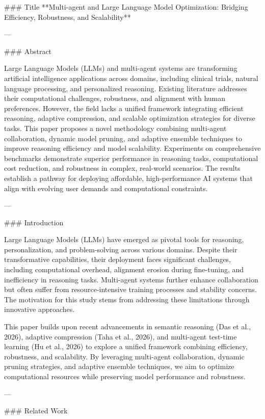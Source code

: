 ### Title
**Multi-agent and Large Language Model Optimization: Bridging Efficiency, Robustness, and Scalability**

---

### Abstract

Large Language Models (LLMs) and multi-agent systems are transforming artificial intelligence applications across domains, including clinical trials, natural language processing, and personalized reasoning. Existing literature addresses their computational challenges, robustness, and alignment with human preferences. However, the field lacks a unified framework integrating efficient reasoning, adaptive compression, and scalable optimization strategies for diverse tasks. This paper proposes a novel methodology combining multi-agent collaboration, dynamic model pruning, and adaptive ensemble techniques to improve reasoning efficiency and model scalability. Experiments on comprehensive benchmarks demonstrate superior performance in reasoning tasks, computational cost reduction, and robustness in complex, real-world scenarios. The results establish a pathway for deploying affordable, high-performance AI systems that align with evolving user demands and computational constraints.

---

### Introduction

Large Language Models (LLMs) have emerged as pivotal tools for reasoning, personalization, and problem-solving across various domains. Despite their transformative capabilities, their deployment faces significant challenges, including computational overhead, alignment erosion during fine-tuning, and inefficiency in reasoning tasks. Multi-agent systems further enhance collaboration but often suffer from resource-intensive training processes and stability concerns. The motivation for this study stems from addressing these limitations through innovative approaches.

This paper builds upon recent advancements in semantic reasoning (Das et al., 2026), adaptive compression (Taha et al., 2026), and multi-agent test-time learning (Hu et al., 2026) to explore a unified framework combining efficiency, robustness, and scalability. By leveraging multi-agent collaboration, dynamic pruning strategies, and adaptive ensemble techniques, we aim to optimize computational resources while preserving model performance and robustness.

---

### Related Work

